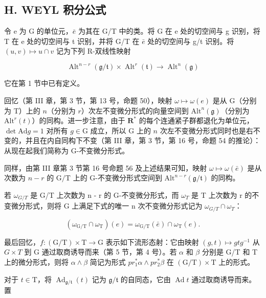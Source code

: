 \subsection{H. WEYL 积分公式}

令 e 为 G 的单位元，\(\bar{e}\) 为其在 G/T 中的类。将 G 在 e 处的切空间与 g 识别，将 T 在 e 处的切空间与 t 识别，并将 G/T 在 \(\bar{e}\) 处的切空间与 g/t 识别。将 \((u,v)\mapsto u\cap v\) 记为下列 R-双线性映射

\[
\operatorname{Alt} ^ {n - r} (\mathfrak {g} / \mathfrak {t}) \times \operatorname{Alt} ^ {r} (\mathfrak {t}) \rightarrow \operatorname{Alt} ^ {n} (\mathfrak {g})
\]

它在第 1 节中已有定义。

回忆（第 III 章，第 3 节，第 13 号，命题 50），映射 \(\omega \mapsto \omega(e)\) 是从 G（分别为 T）上的 \(n\)（分别为 \(r\)）次左不变微分形式的向量空间到 \(\mathrm{Alt}^n(\mathfrak{g})\)（分别为 \(\mathrm{Alt}^r(t)\)）的同构。进一步注意，由于 \(\mathbf{R}^*\) 的每个连通紧子群都退化为单位元，\(\det \mathrm{Ad}g = 1\) 对所有 \(g \in \mathrm{G}\) 成立，所以 G 上的 \(n\) 次左不变微分形式同时也是右不变的，并且在内自同构下不变（第 III 章，第 3 节，第 16 号，命题 54 的推论）：从现在起我们简称为 G-不变微分形式。

同样，由第 III 章第 3 节第 16 号命题 56 及上述结果可知，映射 \(\omega \mapsto \omega (\bar{e})\) 是从次数为 \(n - r\) 的 \(\mathrm{G / T}\) 上的 G-不变微分形式空间到 \(\mathrm{Alt}^{n - r}(\mathfrak{g} / \mathfrak{t})\) 的同构。

若 \(\omega_{G/T}\) 是 G/T 上次数为 n - r 的 G-不变微分形式，而 \(\omega_{T}\) 是 T 上次数为 r 的不变微分形式，则将 G 上满足下式的唯一 n 次不变微分形式记为 \(\omega_{G/T} \cap \omega_{T}\)：

\[
(\omega_ {\mathrm{G/T}} \cap \omega_ {\mathrm{T}}) (e) = \omega_ {\mathrm{G/T}} (\bar {e}) \cap \omega_ {\mathrm{T}} (e).
\]

最后回忆，\(f : (\mathrm{G}/\mathrm{T}) \times \mathrm{T} \to \mathrm{G}\) 表示如下流形态射：它由映射 \((g, t) \mapsto gtg^{-1}\) 从 \(G \times T\) 到 G 通过取商诱导而来（第 5 节，第 4 号）。若 \(\alpha\) 和 \(\beta\) 分别是 G/T 和 T 上的微分形式，则将 \(\alpha \wedge \beta\) 简记为形式 \(pr_{1}^{*}\alpha \wedge pr_{2}^{*}\beta\) 在 \((\mathrm{G}/\mathrm{T}) \times \mathrm{T}\) 上的形式。

对于 \(t \in \mathrm{T}\)，将 \(\operatorname{Ad}_{\mathfrak{g} / \mathfrak{t}}(t)\) 记为 \(\mathfrak{g} / \mathfrak{t}\) 的自同态，它由 \(\operatorname{Ad} t\) 通过取商诱导而来。置

